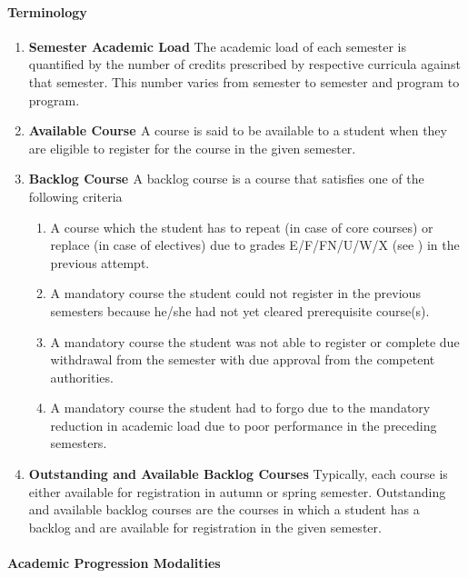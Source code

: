 \paragraph{Terminology}

\begin{enumerate}[leftmargin=15mm]
    \item \textbf{Semester Academic Load\label{lab:Semester Academic Load}} The academic load of each semester is quantified by the number of credits prescribed by respective curricula against that semester. This number varies from semester to semester and \gls{program} to \gls{program}.
    \item \textbf{Available Course \label{lab:Avaiable Course}} A course is said to be available to a \gls{student} when they are eligible to register for the course in the given semester.
    \item \textbf{Backlog Course \label{lab:Backlog Course}} A backlog course is a course that satisfies one of the following criteria
    
    \begin{enumerate}
        \item A course which the \gls{student} has to repeat (in case of core courses) or replace (in case of electives) due to grades E/F/FN/U/W/X (see ) in the previous attempt. 
        \item A mandatory course the \gls{student} could not register in the previous semesters because he/she had not yet cleared prerequisite course(s).
        \item A mandatory course the \gls{student} was not able to register or complete due withdrawal from the semester with due approval from the competent authorities.
        \item A mandatory course the \gls{student} had to forgo due to the mandatory reduction in academic load due to poor performance in the preceding semesters.
    \end{enumerate}
    
    \item \textbf{Outstanding and Available Backlog Courses }Typically, each course is either available for registration in autumn or spring semester. Outstanding and available backlog courses are the courses in which a \gls{student} has a backlog and are available for registration in the given semester.
\end{enumerate}

\paragraph{Academic Progression Modalities}

